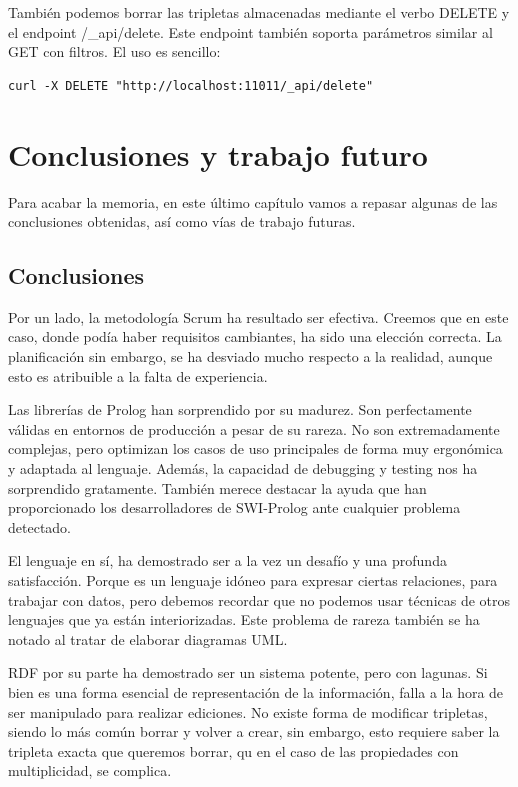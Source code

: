 \documentclass[openright,twoside,12pt]{book}
\begin{document}
También podemos borrar las tripletas almacenadas mediante el verbo DELETE y el endpoint /\_api/delete. Este endpoint también soporta parámetros similar al GET con filtros. El uso es sencillo:

\begin{verbatim}
curl -X DELETE "http://localhost:11011/_api/delete"
\end{verbatim}

\chapter{Conclusiones y trabajo futuro}

Para acabar la memoria, en este último capítulo vamos a repasar algunas de las conclusiones obtenidas, así como vías de trabajo futuras.

\section{Conclusiones}

Por un lado, la metodología Scrum ha resultado ser efectiva. Creemos que en este caso, donde podía haber requisitos cambiantes, ha sido una elección correcta. La planificación sin embargo, se ha desviado mucho respecto a la realidad, aunque esto es atribuible a la falta de experiencia.

Las librerías de Prolog han sorprendido por su madurez. Son perfectamente válidas en entornos de producción a pesar de su rareza. No son extremadamente complejas, pero optimizan los casos de uso principales de forma muy ergonómica y adaptada al lenguaje.  Además, la capacidad de debugging y testing nos ha sorprendido gratamente. También merece destacar la ayuda que han proporcionado los desarrolladores de SWI-Prolog ante cualquier problema detectado.

El lenguaje en sí, ha demostrado ser a la vez un desafío y una profunda satisfacción. Porque es un lenguaje idóneo para expresar ciertas relaciones, para trabajar con datos, pero debemos recordar que no podemos usar técnicas de otros lenguajes que ya están interiorizadas. Este problema de rareza también se ha notado al tratar de elaborar diagramas UML.

RDF por su parte ha demostrado ser un sistema potente, pero con lagunas. Si bien es una forma esencial de representación de la información, falla a la hora de ser manipulado para realizar ediciones. No existe forma de modificar tripletas, siendo lo más común borrar y volver a crear, sin embargo, esto requiere saber la tripleta exacta que queremos borrar, qu en el caso de las propiedades con multiplicidad, se complica.
\end{document}
